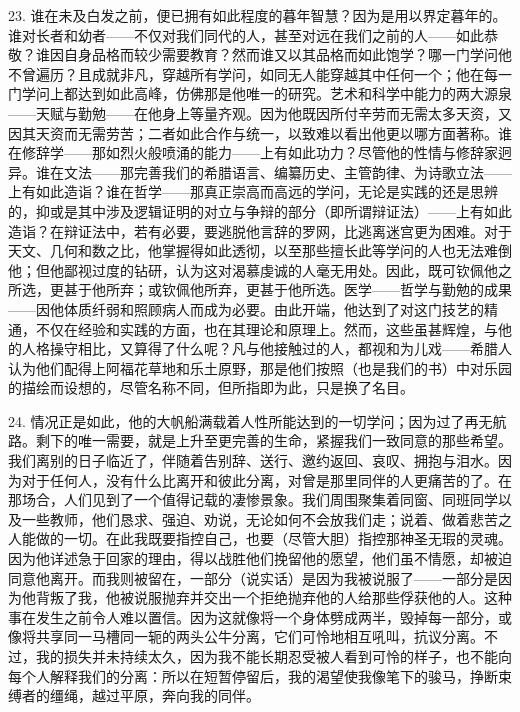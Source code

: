 23. 谁在未及白发之前，便已拥有如此程度的暮年智慧？因为是用以界定暮年的。谁对长者和幼者——不仅对我们同代的人，甚至对远在我们之前的人——如此恭敬？谁因自身品格而较少需要教育？然而谁又以其品格而如此饱学？哪一门学问他不曾遍历？且成就非凡，穿越所有学问，如同无人能穿越其中任何一个；他在每一门学问上都达到如此高峰，仿佛那是他唯一的研究。艺术和科学中能力的两大源泉——天赋与勤勉——在他身上等量齐观。因为他既因所付辛劳而无需太多天资，又因其天资而无需劳苦；二者如此合作与统一，以致难以看出他更以哪方面著称。谁在修辞学——那如烈火般喷涌的能力——上有如此功力？尽管他的性情与修辞家迥异。谁在文法——那完善我们的希腊语言、编纂历史、主管韵律、为诗歌立法——上有如此造诣？谁在哲学——那真正崇高而高远的学问，无论是实践的还是思辨的，抑或是其中涉及逻辑证明的对立与争辩的部分（即所谓辩证法）——上有如此造诣？在辩证法中，若有必要，要逃脱他言辞的罗网，比逃离迷宫更为困难。对于天文、几何和数之比，他掌握得如此透彻，以至那些擅长此等学问的人也无法难倒他；但他鄙视过度的钻研，认为这对渴慕虔诚的人毫无用处。因此，既可钦佩他之所选，更甚于他所弃；或钦佩他所弃，更甚于他所选。医学——哲学与勤勉的成果——因他体质纤弱和照顾病人而成为必要。由此开端，他达到了对这门技艺的精通，不仅在经验和实践的方面，也在其理论和原理上。然而，这些虽甚辉煌，与他的人格操守相比，又算得了什么呢？凡与他接触过的人，都视和为儿戏——希腊人认为他们配得上阿福花草地和乐土原野，那是他们按照（也是我们的书）中对乐园的描绘而设想的，尽管名称不同，但所指即为此，只是换了名目。\par

24. 情况正是如此，他的大帆船满载着人性所能达到的一切学问；因为过了再无航路。剩下的唯一需要，就是上升至更完善的生命，紧握我们一致同意的那些希望。我们离别的日子临近了，伴随着告别辞、送行、邀约返回、哀叹、拥抱与泪水。因为对于任何人，没有什么比离开和彼此分离，对曾是那里同伴的人更痛苦的了。在那场合，人们见到了一个值得记载的凄惨景象。我们周围聚集着同窗、同班同学以及一些教师，他们恳求、强迫、劝说，无论如何不会放我们走；说着、做着悲苦之人能做的一切。在此我既要指控自己，也要（尽管大胆）指控那神圣无瑕的灵魂。因为他详述急于回家的理由，得以战胜他们挽留他的愿望，他们虽不情愿，却被迫同意他离开。而我则被留在，一部分（说实话）是因为我被说服了——一部分是因为他背叛了我，他被说服抛弃并交出一个拒绝抛弃他的人给那些俘获他的人。这种事在发生之前令人难以置信。因为这就像将一个身体劈成两半，毁掉每一部分，或像将共享同一马槽同一轭的两头公牛分离，它们可怜地相互吼叫，抗议分离。不过，我的损失并未持续太久，因为我不能长期忍受被人看到可怜的样子，也不能向每个人解释我们的分离：所以在短暂停留后，我的渴望使我像笔下的骏马，挣断束缚者的缰绳，越过平原，奔向我的同伴。\par

